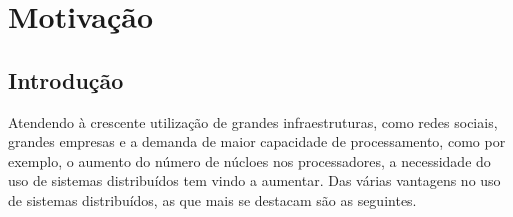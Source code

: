 \chapter{Motivação}
\label{chap:estado-da-arte}

\section{Introdução}
\label{chap2:sec:intro}


Atendendo à crescente utilização de grandes infraestruturas, como redes sociais, grandes empresas e a demanda de maior capacidade de processamento, como por exemplo, o aumento do número de núcloes nos processadores, a necessidade do uso de sistemas distribuídos tem vindo a aumentar.
Das várias vantagens no uso de sistemas distribuídos, as que mais se destacam são as seguintes.


